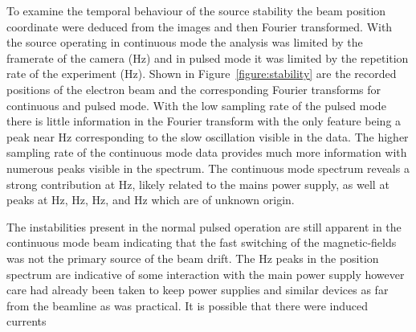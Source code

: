 To examine the temporal behaviour of the source stability the beam position coordinate were deduced from the images and then Fourier transformed.
With the source operating in continuous mode the analysis was limited by the framerate of the camera (\unit[240]{Hz}) and in pulsed mode it was limited by the repetition rate of the experiment (\unit[10]{Hz}).
Shown in Figure~\ref{figure:stability} are the recorded positions of the electron beam and the corresponding Fourier transforms for continuous and pulsed mode.
With the low sampling rate of the pulsed mode there is little information in the Fourier transform with the only feature being a peak near \unit[0]{Hz} corresponding to the slow oscillation visible in the data.
The higher sampling rate of the continuous mode data provides much more information with numerous peaks visible in the spectrum.
The continuous mode spectrum reveals a strong contribution at \unit[50]{Hz}, likely related to the mains power supply, as well at peaks at \unit[45]{Hz}, \unit[67]{Hz}, \unit[84]{Hz}, and \unit[92]{Hz} which are of unknown origin.

The instabilities present in the normal pulsed operation are still apparent in the continuous mode beam indicating that the fast switching of the magnetic-fields was not the primary source of the beam drift.
The \unit[50]{Hz} peaks in the position spectrum are indicative of some interaction with the main power supply however care had already been taken to keep power supplies and similar devices as far from the beamline as was practical.
It is possible that there were induced currents


